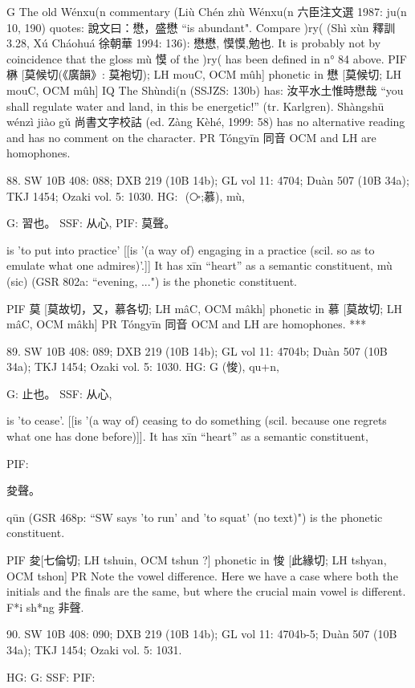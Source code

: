 G	The old Wénxu(n commentary (Liù Chén zhù Wénxu(n 六臣注文選 1987: ju(n 10, 190) quotes: 說文曰：懋，盛懋 ``is abundant".
    Compare )ry( (Shì xùn 釋訓 3.28, Xú Cháohuá 徐朝華 1994: 136): 懋懋, 慔慔,勉也. It is probably not by coincidence that the gloss mù 慔 of the )ry( has been defined in n° 84 above.
PIF     楙 [莫候切(《廣韻》: 莫袍切); LH mouC, OCM mûh] phonetic in 懋 [莫候切; LH mouC, OCM mûh]
IQ The Shùndi(n (SSJZS: 130b) has: 汝平水土惟時懋哉 ``you shall regulate water and land, in this be energetic!'' (tr. Karlgren). Shàngshū wénzì jiào gǔ 尚書文字校詁 (ed. Zàng Kèhé, 1999: 58) has no alternative reading and has no comment on the character.
PR   Tóngyīn 同音 OCM and LH are homophones.

88. SW 10B 408: 088; DXB 219 (10B 14b); GL vol 11: 4704; Duàn 507 (10B 34a); TKJ 1454; Ozaki vol. 5: 1030.
HG:  (⧂;慕), mù,

G:	習也。
SSF: 从心,
PIF: 莫聲。

is 'to put into practice' [[is '(a way of) engaging in a practice (scil. so as to emulate what one admires)'.]]
It has xīn ``heart'' as a semantic constituent,
mù (sic) (GSR 802a: ``evening, ...") is the phonetic constituent.

PIF     莫 [莫故切，又，慕各切; LH mâC, OCM mâkh] phonetic in 慕 [莫故切; LH mâC, OCM mâkh]
PR	Tóngyīn 同音 OCM and LH are homophones.
***



89. SW 10B 408: 089; DXB 219 (10B 14b); GL vol 11: 4704b; Duàn 507 (10B 34a); TKJ 1454; Ozaki vol. 5: 1030.
HG: G (悛), qu+n,

G:	止也。
SSF: 从心,

is 'to cease'. [[is '(a way of) ceasing to do something (scil. because one regrets what one has done before)]].
It has xīn ``heart'' as a semantic constituent,

PIF:

夋聲。

qūn (GSR 468p: ``SW says 'to run' and 'to squat' (no text)") is the phonetic constituent.

PIF     夋[七倫切; LH tshuin, OCM tshun ?] phonetic in 悛 [此緣切; LH tshyan, OCM tshon]
PR	Note the vowel difference. Here we have a case where both the initials and the finals are the same, but where the crucial main vowel is different. F*i sh*ng 非聲.

90. SW 10B 408: 090; DXB 219 (10B 14b); GL vol 11: 4704b-5; Duàn 507 (10B 34a); TKJ 1454; Ozaki vol. 5: 1031.


HG:
G: SSF: PIF:

